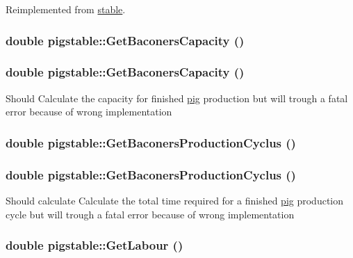 Reimplemented from \hyperlink{classstable_af11653ccffcdc3bfb928d47485fc39b4}{stable}.\hypertarget{classpigstable_a44362a0d046f2c41ac1603e953b8f471}{
\subsubsection[{GetBaconersCapacity}]{\setlength{\rightskip}{0pt plus 5cm}double pigstable::GetBaconersCapacity ()}}
\label{classpigstable_a44362a0d046f2c41ac1603e953b8f471}
\hypertarget{classpigstable_a44362a0d046f2c41ac1603e953b8f471}{
\subsubsection[{GetBaconersCapacity}]{\setlength{\rightskip}{0pt plus 5cm}double pigstable::GetBaconersCapacity ()}}
\label{classpigstable_a44362a0d046f2c41ac1603e953b8f471}
Should Calculate the capacity for finished \hyperlink{classpig}{pig} production but will trough a fatal error because of wrong implementation \hypertarget{classpigstable_a68a621406eb37f6ec5c701da6a08573a}{
\subsubsection[{GetBaconersProductionCyclus}]{\setlength{\rightskip}{0pt plus 5cm}double pigstable::GetBaconersProductionCyclus ()}}
\label{classpigstable_a68a621406eb37f6ec5c701da6a08573a}
\hypertarget{classpigstable_a68a621406eb37f6ec5c701da6a08573a}{
\subsubsection[{GetBaconersProductionCyclus}]{\setlength{\rightskip}{0pt plus 5cm}double pigstable::GetBaconersProductionCyclus ()}}
\label{classpigstable_a68a621406eb37f6ec5c701da6a08573a}
Should calculate Calculate the total time required for a finished \hyperlink{classpig}{pig} production cycle but will trough a fatal error because of wrong implementation \hypertarget{classpigstable_ac14a3ded55664bd4c44841044e787d15}{
\subsubsection[{GetLabour}]{\setlength{\rightskip}{0pt plus 5cm}double pigstable::GetLabour ()}}
